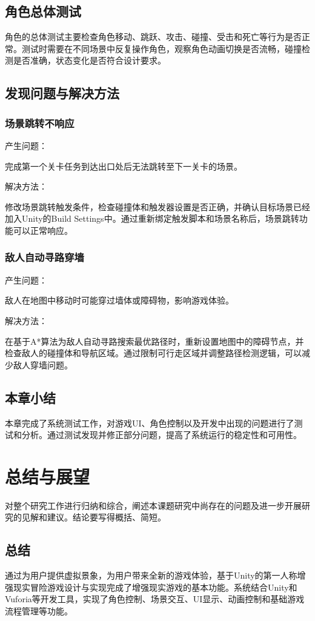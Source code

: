 \documentclass[12pt]{graduate-design-manual}
\begin{document}
\subsection{角色总体测试}
角色的总体测试主要检查角色移动、跳跃、攻击、碰撞、受击和死亡等行为是否正常。测试时需要在不同场景中反复操作角色，观察角色动画切换是否流畅，碰撞检测是否准确，状态变化是否符合设计要求。

\subsection{发现问题与解决方法}
\subsubsection{场景跳转不响应}
产生问题：

完成第一个关卡任务到达出口处后无法跳转至下一关卡的场景。

解决方法：

修改场景跳转触发条件，检查碰撞体和触发器设置是否正确，并确认目标场景已经加入Unity的Build Settings中。通过重新绑定触发脚本和场景名称后，场景跳转功能可以正常响应。

\subsubsection{敌人自动寻路穿墙}
产生问题：

敌人在地图中移动时可能穿过墙体或障碍物，影响游戏体验。

解决方法：

在基于A*算法为敌人自动寻路搜索最优路径时，重新设置地图中的障碍节点，并检查敌人的碰撞体和导航区域。通过限制可行走区域并调整路径检测逻辑，可以减少敌人穿墙问题。

\subsection{本章小结}
本章完成了系统测试工作，对游戏UI、角色控制以及开发中出现的问题进行了测试和分析。通过测试发现并修正部分问题，提高了系统运行的稳定性和可用性。

\section{总结与展望}
对整个研究工作进行归纳和综合，阐述本课题研究中尚存在的问题及进一步开展研究的见解和建议。结论要写得概括、简短。

\subsection{总结}
通过为用户提供虚拟景象，为用户带来全新的游戏体验，基于Unity的第一人称增强现实冒险游戏设计与实现完成了增强现实游戏的基本功能。系统结合Unity和Vuforia等开发工具，实现了角色控制、场景交互、UI显示、动画控制和基础游戏流程管理等功能。
\end{document}
